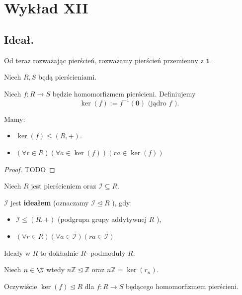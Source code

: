 \chapter{Wykład XII}

\section{Ideał.}

\begin{context}

	Od teraz rozważając pierścień, rozważamy pierścień przemienny z $\mathbf{1}$.
\end{context}
Niech $R,S$ będą pierścieniami.
\begin{definition}[Jądro.]
	Niech $f: R \to S$ będzie homomorfizmem pierścieni. Definiujemy 
	\[
	\ker(f) := f^{-1}\left( \mathbf{0} \right) \text{ (jądro $f$ )}
	.\] 
\end{definition} 
\begin{fact}
	Mamy:
	\begin{itemize}
		\item $\ker(f) \le \left( R,+ \right) $.
		\item $\left(\forall r\in R \right)\left(\forall a \in \ker(f)  \right)\left( ra \in \ker(f)  \right)   $
	\end{itemize}
\end{fact}
\begin{proof}
	TODO
\end{proof} 
\begin{definition}[Ideał.]
	Niech $R$ jest pierścieniem oraz $\mathcal{I} \subseteq R$.

	$\mathcal{I}$ jest \textbf{ideałem} (oznaczamy $\mathcal{I} \unlhd R$ ), gdy:
	\begin{itemize}
		\item $\mathcal{I} \le \left( R,+ \right) $ (podgrupa grupy addytywnej $R$ ),
		\item $\left(\forall r\in R \right)\left(\forall a \in \mathcal{I} \right)\left( ra \in \mathcal{I} \right)   $
	\end{itemize}
\end{definition} 
\begin{remark}
	Ideały w $R$ to dokładnie $R$- podmoduły $R$.
\end{remark} 
\begin{eg}
	Niech $n\in \N$ wtedy $n\mathbb{Z} \unlhd \mathbb{Z} $ oraz $n\mathbb{Z} = \ker(r_{n}) $.

	Oczywiście $\ker(f) \unlhd R$ dla $f: R\to S$ będącego homomorfizmem pierścieni.
\end{eg} 
